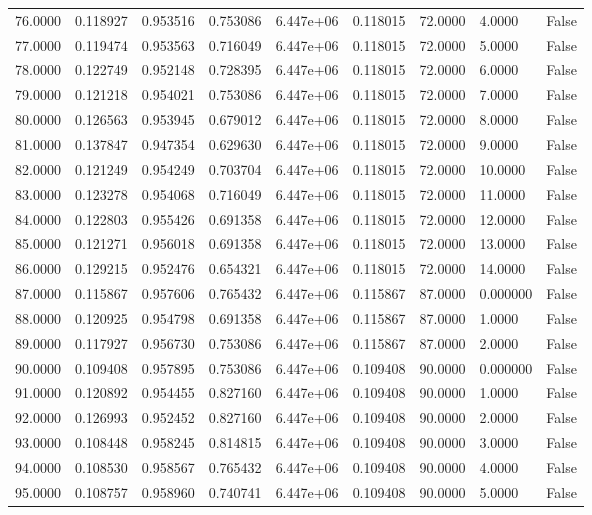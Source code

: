 \documentclass[11pt]{report}
\begin{document}
\begin{longtable}{lllllllll}
76.0000 & 0.118927 & 0.953516 & 0.753086 & 6.447e+06 & 0.118015 & 72.0000 & 4.0000 & False \\
77.0000 & 0.119474 & 0.953563 & 0.716049 & 6.447e+06 & 0.118015 & 72.0000 & 5.0000 & False \\
78.0000 & 0.122749 & 0.952148 & 0.728395 & 6.447e+06 & 0.118015 & 72.0000 & 6.0000 & False \\
79.0000 & 0.121218 & 0.954021 & 0.753086 & 6.447e+06 & 0.118015 & 72.0000 & 7.0000 & False \\
80.0000 & 0.126563 & 0.953945 & 0.679012 & 6.447e+06 & 0.118015 & 72.0000 & 8.0000 & False \\
81.0000 & 0.137847 & 0.947354 & 0.629630 & 6.447e+06 & 0.118015 & 72.0000 & 9.0000 & False \\
82.0000 & 0.121249 & 0.954249 & 0.703704 & 6.447e+06 & 0.118015 & 72.0000 & 10.0000 & False \\
83.0000 & 0.123278 & 0.954068 & 0.716049 & 6.447e+06 & 0.118015 & 72.0000 & 11.0000 & False \\
84.0000 & 0.122803 & 0.955426 & 0.691358 & 6.447e+06 & 0.118015 & 72.0000 & 12.0000 & False \\
85.0000 & 0.121271 & 0.956018 & 0.691358 & 6.447e+06 & 0.118015 & 72.0000 & 13.0000 & False \\
86.0000 & 0.129215 & 0.952476 & 0.654321 & 6.447e+06 & 0.118015 & 72.0000 & 14.0000 & False \\
87.0000 & 0.115867 & 0.957606 & 0.765432 & 6.447e+06 & 0.115867 & 87.0000 & 0.000000 & False \\
88.0000 & 0.120925 & 0.954798 & 0.691358 & 6.447e+06 & 0.115867 & 87.0000 & 1.0000 & False \\
89.0000 & 0.117927 & 0.956730 & 0.753086 & 6.447e+06 & 0.115867 & 87.0000 & 2.0000 & False \\
90.0000 & 0.109408 & 0.957895 & 0.753086 & 6.447e+06 & 0.109408 & 90.0000 & 0.000000 & False \\
91.0000 & 0.120892 & 0.954455 & 0.827160 & 6.447e+06 & 0.109408 & 90.0000 & 1.0000 & False \\
92.0000 & 0.126993 & 0.952452 & 0.827160 & 6.447e+06 & 0.109408 & 90.0000 & 2.0000 & False \\
93.0000 & 0.108448 & 0.958245 & 0.814815 & 6.447e+06 & 0.109408 & 90.0000 & 3.0000 & False \\
94.0000 & 0.108530 & 0.958567 & 0.765432 & 6.447e+06 & 0.109408 & 90.0000 & 4.0000 & False \\
95.0000 & 0.108757 & 0.958960 & 0.740741 & 6.447e+06 & 0.109408 & 90.0000 & 5.0000 & False \\

\end{longtable}
\end{document}

